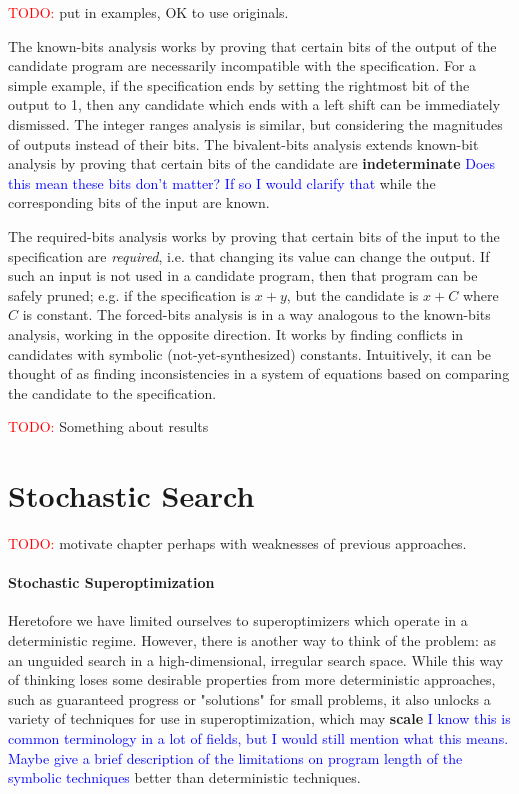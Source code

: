 \documentclass[12pt,twoside]{reedthesis}
\newcommand{\red}[1]{\textcolor{red}{#1}}
\newcommand{\comment}[2]{\textbf{#1} \textcolor{blue}{#2}}
\begin{document}
\red{TODO:} put in examples, OK to use originals.

The known-bits analysis works by proving that certain bits of the output of the candidate program are necessarily incompatible with the specification.
For a simple example, if the specification ends by setting the rightmost bit of the output to 1, then any candidate which ends with a left shift can be immediately dismissed.
The integer ranges analysis is similar, but considering the magnitudes of outputs instead of their bits.
The bivalent-bits analysis extends known-bit analysis by proving that certain bits of the candidate are \comment{indeterminate}{Does this mean these bits don't matter? If so I would clarify that} while the corresponding bits of the input are known.

The required-bits analysis works by proving that certain bits of the input to the specification are \emph{required}, i.e. that changing its value can change the output. If such an input is not used in a candidate program, then that program can be safely pruned; e.g. if the specification is $x + y$, but the candidate is $x + C$ where $C$ is constant.
The forced-bits analysis is in a way analogous to the known-bits analysis, working in the opposite direction. It works by finding conflicts in candidates with symbolic (not-yet-synthesized) constants. Intuitively, it can be thought of as finding inconsistencies in a system of equations based on comparing the candidate to the specification. %

\red{TODO:} Something about results


\chapter{Stochastic Search}
\red{TODO:} motivate chapter perhaps with weaknesses of previous approaches.

\subsubsection{Stochastic Superoptimization}
Heretofore we have limited ourselves to superoptimizers which operate in a deterministic regime.
However, there is another way to think of the problem: as an unguided search in a high-dimensional, irregular search space.
While this way of thinking loses some desirable properties from more deterministic approaches, such as guaranteed progress or "solutions" for small problems, it also unlocks a variety of techniques for use in superoptimization, which may \comment{scale}{I know this is common terminology in a lot of fields, but I would still mention what this means. Maybe give a brief description of the limitations on program length of the symbolic techniques} better than deterministic techniques.
\end{document}
